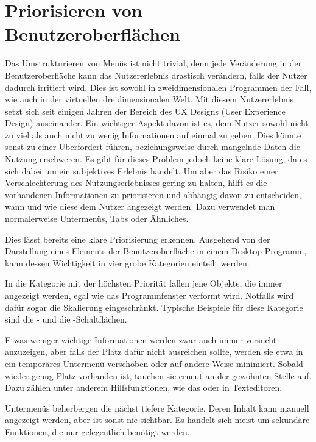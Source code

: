 	\section{Priorisieren von Benutzeroberflächen}\label{chapter:prio}
		Das Umstrukturieren von Menüs ist nicht trivial, denn jede Veränderung in der Benutzeroberfläche kann das Nutzererlebnis drastisch verändern, falls der Nutzer dadurch irritiert wird. Dies ist sowohl in zweidimensionalen Programmen der Fall, wie auch in der virtuellen dreidimensionalen Welt.
		Mit diesem Nutzererlebnis setzt sich seit einigen Jahren der Bereich des UX Designs (User Experience Design) auseinander.
		Ein wichtiger Aspekt davon ist es, dem Nutzer sowohl nicht zu viel als auch nicht zu wenig Informationen auf einmal zu geben. Dies könnte sonst zu einer Überfordert führen, beziehungsweise durch mangelnde Daten die Nutzung erschweren.
		Es gibt für dieses Problem jedoch keine klare Lösung, da es sich dabei um ein subjektives Erlebnis handelt.
		Um aber das Risiko einer Verschlechterung des Nutzungserlebnisses gering zu halten, hilft es die vorhandenen Informationen zu priorisieren und abhängig davon zu entscheiden, wann und wie diese dem Nutzer angezeigt werden. Dazu verwendet man normalerweise Untermenüs, Tabs oder Ähnliches.\cite{UXNatoli}
		
		
		Dies lässt bereits eine klare Priorisierung erkennen.
		Ausgehend von der Darstellung eines Elements der Benutzeroberfläche in einem Desktop-Programm, kann dessen Wichtigkeit in vier grobe Kategorien einteilt werden.
		
		In die Kategorie mit der höchsten Priorität fallen jene Objekte, die immer angezeigt werden, egal wie das Programmfenster verformt wird. Notfalls wird dafür sogar die Skalierung eingeschränkt. Typische Beispiele für diese Kategorie sind die - und die -Schaltflächen.
		
		Etwas weniger wichtige Informationen werden zwar auch immer versucht anzuzeigen, aber falls der Platz dafür nicht ausreichen sollte, werden sie etwa in ein temporäres Untermenü verschoben oder auf andere Weise minimiert. Sobald wieder genug Platz vorhanden ist, tauchen sie erneut an der gewohnten Stelle auf. Dazu zählen unter anderem Hilfsfunktionen, wie das  oder  in Texteditoren.
		
		Untermenüs beherbergen die nächst tiefere Kategorie. Deren Inhalt kann manuell angezeigt werden, aber ist sonst nie sichtbar. Es handelt sich meist um sekundäre Funktionen, die nur gelegentlich benötigt werden.
		
